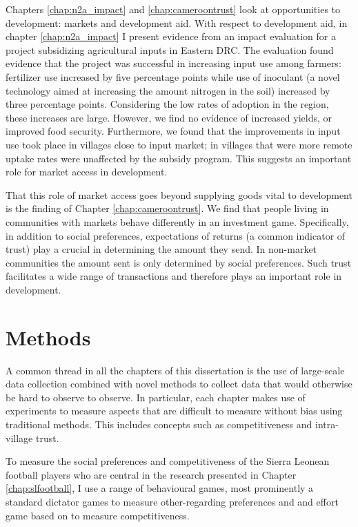 Chapters \ref{chap:n2a_impact} and \ref{chap:cameroontrust} look at opportunities to development: markets and development aid. With respect to development aid, in chapter \ref{chap:n2a_impact} I present evidence from an impact evaluation for a project subsidizing agricultural inputs in Eastern DRC. The evaluation found evidence that the project was successful in increasing input use among farmers: fertilizer use increased by five percentage points while use of inoculant (a novel technology aimed at increasing the amount nitrogen in the soil) increased by three percentage points. Considering the low rates of adoption in the region, these increases are large. However, we find no evidence of increased yields, or improved food security. Furthermore, we found that the improvements in input use took place in villages close to input market; in villages that were more remote uptake rates were unaffected by the subsidy program. This suggests an important role for market access in development.

That this role of market access goes beyond supplying goods vital to development is the finding of Chapter \ref{chap:cameroontrust}. We find that people living in communities with markets behave differently in an investment game. Specifically, in addition to social preferences, expectations of returns (a common indicator of trust) play a crucial in determining the amount they send. In non-market communities the amount sent is only determined by social preferences. 	Such trust facilitates a wide range of transactions and therefore plays an important role in development.

\section{Methods}
A common thread in all the chapters of this dissertation is the use of large-scale data collection combined with novel methods to collect data that would otherwise be hard to observe to observe. In particular, each chapter makes  use of experiments to measure aspects that are difficult to measure without bias using traditional methods. This includes concepts such as competitiveness and intra-village trust.

To measure the social preferences and competitiveness of the Sierra Leonean football players who are central in the research presented in Chapter \ref{chap:slfootball}, I use a range of behavioural games, most prominently a standard dictator games to measure other-regarding preferences and and effort game based on \citet{Niederle2007} to measure competitiveness.  

